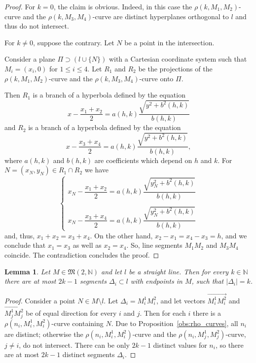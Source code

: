 \documentclass[a4paper,14pt]{article} %
\theoremstyle{plain}
\newtheorem{lemma}[theorem]{Lemma}
\theoremstyle{definition}
\begin{document}
\begin{proof}
	For $k=0$, the claim is obvious.
	Indeed, in this case the $\rho(k,M_1, M_2)$-curve and the $\rho(k,M_3, M_4)$-curve
	are distinct hyperplanes orthogonal to $l$ and thus do not intersect.

	For $k\neq 0$, suppose the contrary.
	Let $N$ be a point in the intersection.

	Consider a plane $\Pi \supset (l \cup \{N\})$
	with a Cartesian coordinate system such that $M_i = (x_i,0)$ for $1 \leq i \leq 4$.
	Let $R_1$ and $R_2$ be the projections
	of the $\rho(k,M_1, M_2)$-curve and the $\rho(k,M_3, M_4)$-curve onto $\Pi$.

	Then $R_1$ is a branch of a hyperbola defined by the equation
	\begin{equation}
		x- \frac{x_1+x_2}{2}=a(h,k)\frac{\sqrt{y^2+b^2(h,k)}}{b(h,k)}
	\end{equation}
	and $R_2$ is a branch of a hyperbola defined by the equation
	\begin{equation}
		x- \frac{x_3+x_4}{2}=a(h,k)\frac{\sqrt{y^2+b^2(h,k)}}{b(h,k)}
		,
	\end{equation}
	where $a(h,k)$ and $b(h,k)$ are coefficients which depend on $h$ and $k$.
	For $N=(x_N, y_N) \in R_1 \cap R_2$ we have
	\begin{equation}
		\begin{cases}
			x_N- \dfrac{x_1+x_2}{2}=a(h,k)\dfrac{\sqrt{y_N^2+b^2(h,k)}}{b(h,k)}
			\\[4pt]\\
			x_N- \dfrac{x_3+x_4}{2}=a(h,k)\dfrac{\sqrt{y_N^2+b^2(h,k)}}{b(h,k)}
		\end{cases}
	\end{equation}
	and, thus, $x_1+x_2 = x_3+x_4$.
	On the other hand, $x_2 - x_1 = x_4 - x_3 = h$,
	and we conclude that $x_1 = x_3$ as well as $x_2 = x_4$.
	So, line segments $M_1 M_2$ and $M_3 M_4$ coincide.
	The contradiction concludes the proof.
\end{proof}

\begin{lemma}
	\label{lem:2k-1_segments}
	Let $M \in \mathfrak{M}(2,\mathbb{N})$ and let $l$ be a straight line.
	Then for every $k\in\mathbb{N}$ there are at most $2k-1$ segments $\Delta_i \subset l$ with endpoints in $M$,
	such that $|\Delta_i| = k$.
\end{lemma}
\begin{proof}
	Consider a point $N\in M \setminus l$.
	Let $\Delta_i = M_i^1 M_i^2$, and
	let vectors $\overrightarrow{M_i^1 M_i^2}$ and $\overrightarrow{M_j^1 M_j^2}$ be of equal direction for every $i$ and $j$.
	Then for each $i$ there is a $\rho(n_i, M_i^1, M_i^2)$-curve containing $N$.
	Due to Proposition~\ref{obs:rho_curves}, all $n_i$ are distinct;
	otherwise the $\rho(n_i,M_i^1, M_i^2)$-curve and the $\rho(n_i,M_j^1, M_j^2)$-curve, $j\neq i$, do not intersect.
	There can be only $2k-1$ distinct values for $n_i$,
	so there are at most $2k-1$ distinct segments $\Delta_i$.
\end{proof}
\end{document}
